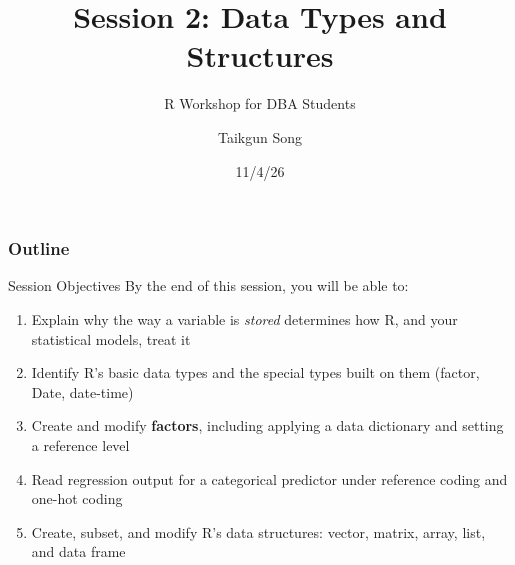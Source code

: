\documentclass[
  ignorenonframetext,
  aspectratio=169,
]{beamer}
\title{Session 2: Data Types and Structures}
\subtitle{R Workshop for DBA Students}
\author{Taikgun Song}
\date{11/4/26}
\providecommand{\tightlist}{%
  \setlength{\itemsep}{0pt}\setlength{\parskip}{0pt}}\usepackage{longtable,booktabs,array}
\renewcommand*\contentsname{Table of contents}
\newcommand\contentsname{Table of contents}
\begin{document}
\frame{\titlepage}
\ifdefined\Shaded\renewenvironment{Shaded}{\begin{tcolorbox}[breakable, interior hidden, sharp corners, enhanced, frame hidden, borderline west={3pt}{0pt}{shadecolor}, boxrule=0pt]}{\end{tcolorbox}}\fi

\renewcommand*\contentsname{Outline}
\begin{frame}[allowframebreaks]
  \frametitle{Outline}
  \tableofcontents[hideallsubsections]
\end{frame}
\begin{frame}
\end{frame}

\begin{frame}{Session Objectives}
\protect\hypertarget{session-objectives}{}
By the end of this session, you will be able to:

\begin{enumerate}
\tightlist
\item
  Explain why the way a variable is \emph{stored} determines how R, and
  your statistical models, treat it
\item
  Identify R's basic data types and the special types built on them
  (factor, Date, date-time)
\item
  Create and modify \textbf{factors}, including applying a data
  dictionary and setting a reference level
\item
  Read regression output for a categorical predictor under reference
  coding and one-hot coding
\item
  Create, subset, and modify R's data structures: vector, matrix, array,
  list, and data frame
\end{enumerate}
\end{frame}
\end{document}
